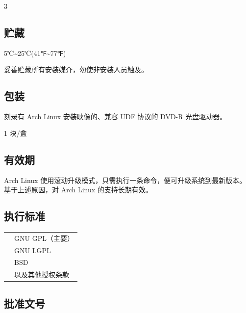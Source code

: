 \documentclass{article}
\begin{document}
\begin{multicols*}{3}
\begin{tcolorbox}
	\section*{贮藏}
	\end{tcolorbox}

	5℃\textasciitilde25℃(41℉\textasciitilde77℉)

	妥善贮藏所有安装媒介，勿使非安装人员触及。

	\medskip


	\begin{tcolorbox}
	\section*{包装}
	\end{tcolorbox}

	刻录有 Arch Linux 安装映像的、兼容 UDF 协议的 DVD-R 光盘驱动器。

	1 块/盒

	\medskip


	\begin{tcolorbox}
	\section*{有效期}
	\end{tcolorbox}

	Arch Linux 使用滚动升级模式，只需执行一条命令，便可升级系统到最新版本。基于上述原因，对 Arch Linux 的支持长期有效。

	\medskip


	\begin{tcolorbox}
	\section*{执行标准}
	\end{tcolorbox}
	\begin{tabularx}{\linewidth}{@{}ll@{}}
		\multirow{4}{*}{}{开源许可证：} & GNU GPL（主要）\\
		~ & GNU LGPL \\
		~ & BSD \\
		~ & 以及其他授权条款 \\
	\end{tabularx}

	\medskip


	\begin{tcolorbox}
	\section*{批准文号}
	\end{tcolorbox}


\end{multicols*}
\end{document}
